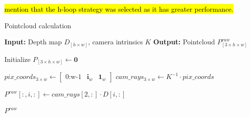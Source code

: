 \hl{mention that the h-loop strategy was selected as it has greater performance.}

\begin{algorithm}
    \caption{Pointcloud calculation}
    \label{algorithm:scene_pcd_hloop}
    \footnotesize

    \begin{algorithmic}[1]
        \State \textbf{Input:} Depth map $D_{\left[h \times w\right]}$, camera intrinsics $K$ 
        \State \textbf{Output:} Pointcloud $P^{raw}_{\left[3 \times h \times w\right]}$
        
        \State Initialize $P_{\left[3 \times h \times w\right]} \gets \mathbf{0}$

            \State $pix\_coords_{3 \times w} \gets \begin{bmatrix} \text{0:w-1} & \mathbf{i}_w & \mathbf{1}_w \end{bmatrix}$
            \State $cam\_rays_{3 \times w} \gets K^{-1} \cdot pix\_coords$
            
            \State $P^{raw}[:, i, :] \gets cam\_rays[2, :] \cdot D[i, :]$  
        \EndFor
        
        \State \Return $P^{raw}$
    \end{algorithmic}
\end{algorithm}


